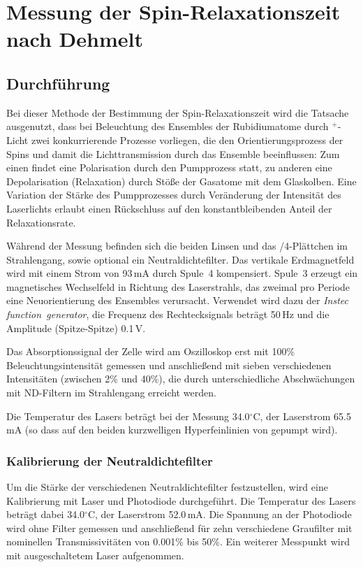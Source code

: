 \section{Messung der Spin-Relaxationszeit nach Dehmelt}
\label{sect:dehmelt}
\subsection{Durchführung}
Bei dieser Methode der Bestimmung der Spin-Relaxationszeit wird die Tatsache ausgenutzt,
dass bei Beleuchtung des Ensembles der Rubidiumatome durch \textsigma$^+$-Licht
zwei konkurrierende Prozesse vorliegen, die den Orientierungsprozess der Spins und damit
die Lichttransmission durch das Ensemble beeinflussen:
Zum einen findet eine Polarisation durch den Pumpprozess statt,
zu anderen eine Depolarisation (Relaxation) durch Stöße der Gasatome mit dem Glaskolben.
Eine Variation der Stärke des Pumpprozesses durch Veränderung der Intensität des Laserlichts
erlaubt einen Rückschluss auf den konstantbleibenden Anteil der Relaxationsrate.

Während der Messung befinden sich die beiden Linsen und das \textlambda/4-Plättchen im Strahlengang,
sowie optional ein Neutraldichtefilter.
Das vertikale Erdmagnetfeld wird mit einem Strom von 93\,mA durch Spule~4 kompensiert.
Spule~3 erzeugt ein magnetisches Wechselfeld in Richtung des Laserstrahls,
das zweimal pro Periode eine Neuorientierung des Ensembles verursacht.
Verwendet wird dazu der \emph{Instec function~generator},
die Frequenz des Rechtecksignals beträgt 50\,Hz und die Amplitude (Spitze-Spitze) 0.1\,V.

Das Absorptionssignal der Zelle wird am Oszilloskop erst mit 100\% Beleuchtungsintensität gemessen
und anschließend mit sieben verschiedenen Intensitäten (zwischen 2\% und 40\%),
die durch unterschiedliche Abschwächungen mit ND-Filtern im Strahlengang erreicht werden.

Die Temperatur des Lasers beträgt bei der Messung 34.0$^\circ$C, der Laserstrom 65.5\,mA
(so dass auf den beiden kurzwelligen Hyperfeinlinien von  gepumpt wird).







\subsubsection*{Kalibrierung der Neutraldichtefilter}
Um die Stärke der verschiedenen Neutraldichtefilter festzustellen,
wird eine Kalibrierung mit Laser und Photodiode durchgeführt.
Die Temperatur des Lasers beträgt dabei 34.0$^\circ$C, der Laserstrom 52.0\,mA.
Die Spannung an der Photodiode wird ohne Filter gemessen und anschließend für zehn verschiedene Graufilter
mit nominellen Transmissivitäten von 0.001\% bis 50\%.
Ein weiterer Messpunkt wird mit ausgeschaltetem Laser aufgenommen.


